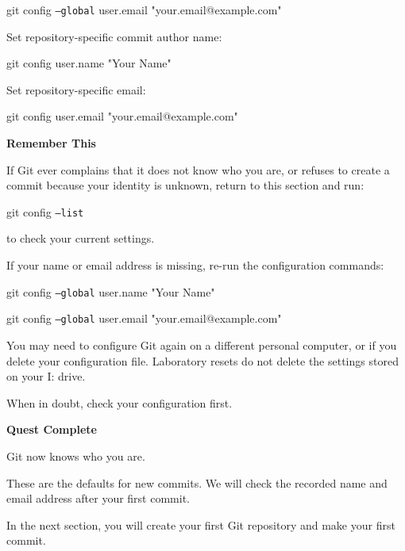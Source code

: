 \documentclass{csc2059practical}
\begin{document}
\begin{terminalplain}
git config \texttt{--global} user.email "your.email@example.com"
\end{terminalplain}
Set repository-specific commit author name:

\begin{terminalplain}
git config user.name "Your Name"
\end{terminalplain}
Set repository-specific email:

\begin{terminalplain}
git config user.email "your.email@example.com"
\end{terminalplain}
\begin{importantnote}
\textbf{Remember This}\par
\medskip
If Git ever complains that it does not know who you are, or refuses to create a commit because your identity is unknown, return to this section and run:

\begin{terminalplain}
  git config \texttt{--list}
\end{terminalplain}
to check your current settings.

If your name or email address is missing, re-run the configuration commands:

\begin{terminalplain}
  git config \texttt{--global} user.name "Your Name"
\end{terminalplain}
\begin{terminalplain}
  git config \texttt{--global} user.email "your.email@example.com"
\end{terminalplain}
You may need to configure Git again on a different personal computer, or if you delete your configuration file. Laboratory resets do not delete the settings stored on your I: drive.

When in doubt, check your configuration first.
\end{importantnote}

\begin{wrapupbox}
\textbf{Quest Complete}\par
\medskip
Git now knows who you are.

These are the defaults for new commits. We will check the recorded name and email address after your first commit.

In the next section, you will create your first Git repository and make your first commit.
\end{wrapupbox}
\end{document}
